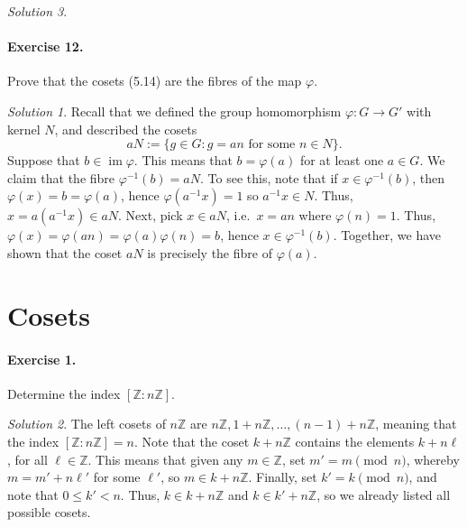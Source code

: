 \documentclass[11pt]{report}
\def\Z{\mathbb{Z}}
\DeclareMathOperator\im{im}
\theoremstyle{remark}
\newtheorem*{solution}{Solution}
\begin{document}
\begin{solution}
    \paragraph{Exercise 12.} Prove that the cosets (5.14) are the fibres of the map
    $\varphi$.
    \begin{solution}
        Recall that we defined the group homomorphism $\varphi\colon G \to G'$ with
        kernel $N$, and described the cosets \[
            aN := \{g \in G \colon g = an \text{ for some }n \in N\}.
        \] Suppose that $b \in \im{\varphi}$. This means that $b = \varphi(a)$ for
        at least one $a \in G$. We claim that the fibre $\varphi^{-1}(b) = aN$.
        To see this, note that if $x \in \varphi^{-1}(b)$, then $\varphi(x) = b =
        \varphi(a)$, hence $\varphi(a^{-1}x) = 1$ so $a^{-1}x \in N$. Thus, $x =
        a(a^{-1}x) \in aN$. Next, pick $x \in aN$, i.e.\ $x = an$ where $\varphi(n)
        = 1$. Thus, $\varphi(x) = \varphi(an) = \varphi(a)\varphi(n) = b$, hence $x
        \in \varphi^{-1}(b)$. Together, we have shown that the coset $aN$ is
        precisely the fibre of $\varphi(a)$.
    \end{solution}
    
    
    
    \section{Cosets}

    \paragraph{Exercise 1.} Determine the index $[\Z : n\Z]$.
    \begin{solution}
        The left cosets of $n\Z$ are $n\Z, 1 + n\Z, \dots, (n - 1) + n\Z$, meaning
        that the index $[\Z\colon n\Z] = n$. Note that the coset $k + n\Z$ contains
        the elements $k + n\ell$, for all $\ell \in \Z$. This means that given any
        $m \in \Z$, set $m' = m\pmod{n}$, whereby $m = m' + n\ell'$ for some
        $\ell'$, so $m \in k + n\Z$. Finally, set $k' = k\pmod{n}$, and note that $0
        \leq k' < n$. Thus, $k \in k + n\Z$ and $k \in k' + n\Z$, so we already
        listed all possible cosets.
    \end{solution}


\end{solution}
\end{document}
